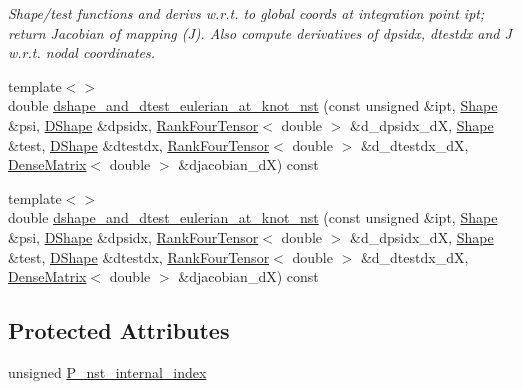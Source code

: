 \begin{DoxyCompactItemize}
\begin{DoxyCompactList}\small\item\em Shape/test functions and derivs w.\+r.\+t. to global coords at integration point ipt; return Jacobian of mapping (J). Also compute derivatives of dpsidx, dtestdx and J w.\+r.\+t. nodal coordinates. \end{DoxyCompactList}\item 
{\footnotesize template$<$$>$ }\\double \hyperlink{classoomph_1_1QCrouzeixRaviartElement_a3984e7b6832c1794ae50cda8a48b8e75}{dshape\+\_\+and\+\_\+dtest\+\_\+eulerian\+\_\+at\+\_\+knot\+\_\+nst} (const unsigned \&ipt, \hyperlink{classoomph_1_1Shape}{Shape} \&psi, \hyperlink{classoomph_1_1DShape}{D\+Shape} \&dpsidx, \hyperlink{classoomph_1_1RankFourTensor}{Rank\+Four\+Tensor}$<$ double $>$ \&d\+\_\+dpsidx\+\_\+dX, \hyperlink{classoomph_1_1Shape}{Shape} \&test, \hyperlink{classoomph_1_1DShape}{D\+Shape} \&dtestdx, \hyperlink{classoomph_1_1RankFourTensor}{Rank\+Four\+Tensor}$<$ double $>$ \&d\+\_\+dtestdx\+\_\+dX, \hyperlink{classoomph_1_1DenseMatrix}{Dense\+Matrix}$<$ double $>$ \&djacobian\+\_\+dX) const
\item 
{\footnotesize template$<$$>$ }\\double \hyperlink{classoomph_1_1QCrouzeixRaviartElement_a31e6429e9b705412f687b0304c2fd93b}{dshape\+\_\+and\+\_\+dtest\+\_\+eulerian\+\_\+at\+\_\+knot\+\_\+nst} (const unsigned \&ipt, \hyperlink{classoomph_1_1Shape}{Shape} \&psi, \hyperlink{classoomph_1_1DShape}{D\+Shape} \&dpsidx, \hyperlink{classoomph_1_1RankFourTensor}{Rank\+Four\+Tensor}$<$ double $>$ \&d\+\_\+dpsidx\+\_\+dX, \hyperlink{classoomph_1_1Shape}{Shape} \&test, \hyperlink{classoomph_1_1DShape}{D\+Shape} \&dtestdx, \hyperlink{classoomph_1_1RankFourTensor}{Rank\+Four\+Tensor}$<$ double $>$ \&d\+\_\+dtestdx\+\_\+dX, \hyperlink{classoomph_1_1DenseMatrix}{Dense\+Matrix}$<$ double $>$ \&djacobian\+\_\+dX) const
\end{DoxyCompactItemize}
\subsection*{Protected Attributes}
\begin{DoxyCompactItemize}
\item 
unsigned \hyperlink{classoomph_1_1QCrouzeixRaviartElement_a50b6de74ff6201ea44db66c72063ecf4}{P\+\_\+nst\+\_\+internal\+\_\+index}
\end{DoxyCompactItemize}
